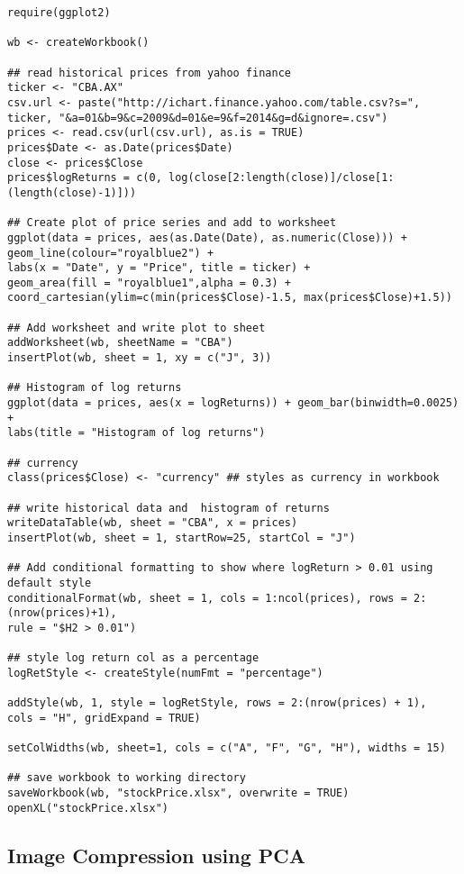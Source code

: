 \documentclass[11pt]{article}\usepackage[]{graphicx}\usepackage[]{color}
\begin{document}
\begin{verbatim}
require(ggplot2)

wb <- createWorkbook()

## read historical prices from yahoo finance
ticker <- "CBA.AX"
csv.url <- paste("http://ichart.finance.yahoo.com/table.csv?s=",
ticker, "&a=01&b=9&c=2009&d=01&e=9&f=2014&g=d&ignore=.csv")
prices <- read.csv(url(csv.url), as.is = TRUE)
prices$Date <- as.Date(prices$Date)
close <- prices$Close
prices$logReturns = c(0, log(close[2:length(close)]/close[1:(length(close)-1)]))

## Create plot of price series and add to worksheet
ggplot(data = prices, aes(as.Date(Date), as.numeric(Close))) +
geom_line(colour="royalblue2") +
labs(x = "Date", y = "Price", title = ticker) +
geom_area(fill = "royalblue1",alpha = 0.3) +
coord_cartesian(ylim=c(min(prices$Close)-1.5, max(prices$Close)+1.5)) 

## Add worksheet and write plot to sheet
addWorksheet(wb, sheetName = "CBA")
insertPlot(wb, sheet = 1, xy = c("J", 3))

## Histogram of log returns
ggplot(data = prices, aes(x = logReturns)) + geom_bar(binwidth=0.0025) +
labs(title = "Histogram of log returns")

## currency 
class(prices$Close) <- "currency" ## styles as currency in workbook

## write historical data and  histogram of returns
writeDataTable(wb, sheet = "CBA", x = prices)
insertPlot(wb, sheet = 1, startRow=25, startCol = "J")

## Add conditional formatting to show where logReturn > 0.01 using default style
conditionalFormat(wb, sheet = 1, cols = 1:ncol(prices), rows = 2:(nrow(prices)+1),
rule = "$H2 > 0.01")

## style log return col as a percentage  
logRetStyle <- createStyle(numFmt = "percentage")

addStyle(wb, 1, style = logRetStyle, rows = 2:(nrow(prices) + 1), 
cols = "H", gridExpand = TRUE)

setColWidths(wb, sheet=1, cols = c("A", "F", "G", "H"), widths = 15)

## save workbook to working directory
saveWorkbook(wb, "stockPrice.xlsx", overwrite = TRUE)
openXL("stockPrice.xlsx")
\end{verbatim}

\newpage

\subsection{Image Compression using PCA}
\end{document}
